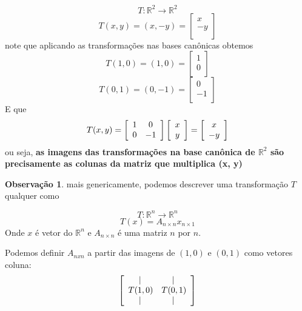 \documentclass[12pt]{report}
\theoremstyle{definition}
\newtheorem*{remark}{Observação}
\begin{document}
\[ T: \mathbb{R}^2 \longrightarrow \mathbb{R}^2 \]
\[ T(x, y) = (x, -y) =
  \left[ 
  {
    \begin{array}{c}
    x \\
   -y \\
    \end{array} 
    } 
  \right]
\]
note que aplicando as transformações nas bases canônicas obtemos
\[
T(1,0) = 
(1, 0) =
\left[ 
    {
        \begin{array}{c}
            1      \\
            0      \\
        \end{array} 
    } 
\right]
\]
\[
T(0,1) = 
(0, -1) =
\left[ 
    {
        \begin{array}{c}
            0      \\
            -1      \\
        \end{array} 
    } 
\right]
\]
E que 
\[ T(x, y) =
    \left[ 
    {
        \begin{array}{c c}
            1 &  0 \\
            0 & -1 \\
        \end{array} 
    } 
    \right]
    \left[ 
    {
        \begin{array}{c}
            x \\
            y \\
        \end{array} 
    } 
    \right]
    =
    \left[ 
    {
        \begin{array}{c}
            x \\
            -y \\
        \end{array} 
    } 
    \right]
\]
ou seja, \textbf{as imagens das transformações na base canônica de \( \mathbb{R}^{2} \) são precisamente as colunas da matriz que multiplica (x, y)}

\begin{remark}

mais genericamente, podemos descrever uma transformação \(T\) qualquer como


\[
    T: \mathbb{R}^{n} \longrightarrow \mathbb{R}^{n} 
\]
\[
    T(x) = A_{n \times n}x_{n \times 1} 
\]
Onde \(x\) é vetor do \(\mathbb{R}^{n}\) e \( A_{n \times n}\) é uma matriz \(n\) por \(n\).

Podemos definir \(A_{n x n}\) a partir das imagens de \( (1,0) \) e \( (0,1) \) como vetores coluna:
\[
    \left[ 
        {
            \begin{array}{c c}
                |\,    & |\,      \\
                T(1,0) & T(0,1)   \\
                |\,    & |\,      \\
            \end{array} 
        } 
    \right]
\]
\end{remark}
\end{document}
